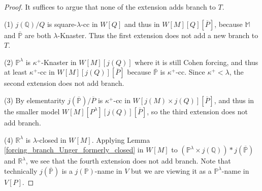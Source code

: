 \documentclass[10pt,a4paper]{amsart}
\begin{document}
\begin{proof}
It suffices to argue that none of the extension adds branch to $T$.

(1) $j(\mathbb{Q})/Q$ is square-$\lambda$-cc in $W[Q]$ and thus in $W[M][Q][\overline{P}]$, because $\mathbb{M}$ and $\overline{\mathbb{P}}$ are both $\lambda$-Knaster. Thus the first extension does not add a new branch to $T$.

(2) $\mathbb{P}^\lambda$ is $\kappa^+$-Knaster in $W[M][j(Q)]$ where it is still Cohen forcing, and thus at least $\kappa^+$-cc in $W[M][j(Q)][\overline{P}]$ because $\mathbb{\overline{P}}$ is $\kappa^+$-cc. Since $\kappa^+<\lambda$, the second extension does not add branch.

(3) By elementarity $j(\mathbb{\overline{P}})/\overline{P}$ is $\kappa^+$-cc in $W[j(M)\times j(Q)][\overline{P}]$, and thus in the smaller model $W[M][P^\lambda][j(Q)][\overline{P}]$, so the third extension does not add branch.

(4) $\mathbb{R}^\lambda$ is $\lambda$-closed in $W[M]$. Applying Lemma \ref{forcing_branch_Unger_formerly_closed} in $W[M]$ to $(\mathbb{P}^\lambda\times j(\mathbb{Q})) *j(\mathbb{\overline{P}})$ and $\mathbb{R}^\lambda$, we see that the fourth extension does not add branch. Note that technically $j(\mathbb{\overline{P}})$ is a $j(\mathbb{P})$-name in $V$ but we are viewing it as a $\mathbb{P}^\lambda$-name in $V[P]$.
\end{proof}
\end{document}
